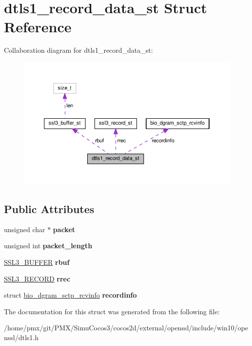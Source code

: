 \hypertarget{structdtls1__record__data__st}{}\section{dtls1\+\_\+record\+\_\+data\+\_\+st Struct Reference}
\label{structdtls1__record__data__st}


Collaboration diagram for dtls1\+\_\+record\+\_\+data\+\_\+st\+:
\nopagebreak
\begin{figure}[H]
\begin{center}
\leavevmode
\includegraphics[width=350pt]{structdtls1__record__data__st__coll__graph}
\end{center}
\end{figure}
\subsection*{Public Attributes}
\begin{DoxyCompactItemize}
\item 
\mbox{\label{structdtls1__record__data__st_af010cf2b401153c4312245f1d62edc95}} 
unsigned char $\ast$ {\bfseries packet}
\item 
\mbox{\label{structdtls1__record__data__st_a37b63c2a75775b814e855a5fc59dca26}} 
unsigned int {\bfseries packet\+\_\+length}
\item 
\mbox{\label{structdtls1__record__data__st_ae1bd1518437b259efb71f1a80b612213}} 
\hyperlink{structssl3__buffer__st}{S\+S\+L3\+\_\+\+B\+U\+F\+F\+ER} {\bfseries rbuf}
\item 
\mbox{\label{structdtls1__record__data__st_a4b62074b684a63163d87bfbf27bc8453}} 
\hyperlink{structssl3__record__st}{S\+S\+L3\+\_\+\+R\+E\+C\+O\+RD} {\bfseries rrec}
\item 
\mbox{\label{structdtls1__record__data__st_a0b4f7a6a839c605efd493b4c6c0a437b}} 
struct \hyperlink{structbio__dgram__sctp__rcvinfo}{bio\+\_\+dgram\+\_\+sctp\+\_\+rcvinfo} {\bfseries recordinfo}
\end{DoxyCompactItemize}


The documentation for this struct was generated from the following file\+:\begin{DoxyCompactItemize}
\item 
/home/pmx/git/\+P\+M\+X/\+Simu\+Cocos3/cocos2d/external/openssl/include/win10/openssl/dtls1.\+h\end{DoxyCompactItemize}
